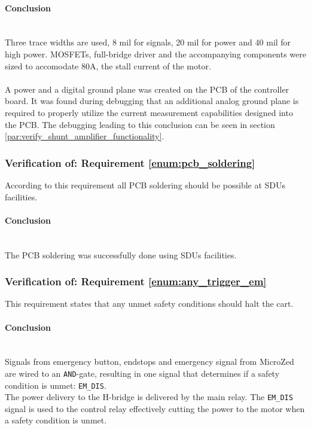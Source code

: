 \paragraph{Conclusion}~\\
Three trace widths are used, 8 mil for signals, 20 mil for power and 40 mil for high power.
MOSFETs, full-bridge driver and the accompanying components were sized to accomodate 80A, the stall current of the motor.
\\~\\
A power and a digital ground plane was created on the PCB of the controller board.
It was found during debugging that an additional analog ground plane is required to properly utilize the current measurement capabilities designed into the PCB.
The debugging leading to this conclusion can be seen in section \ref{par:verify_shunt_amplifier_functionality}.

\subsubsection{Verification of: Requirement \ref{enum:pcb_soldering}} %
\label{ssub:requirement_enum:pcb_soldering}
According to this requirement all PCB soldering should be possible at SDUs facilities.
\paragraph{Conclusion}~\\
The PCB soldering was successfully done using SDUs facilities.

\subsubsection{Verification of: Requirement \ref{enum:any_trigger_em}} %
\label{ssub:requirement_enum:any_trigger_em}
This requirement states that any unmet safety conditions should halt the cart.

\paragraph{Conclusion}~\\
Signals from emergency button, endstops and emergency signal from MicroZed are wired to an \texttt{AND}-gate, resulting in one signal that determines if a safety condition is unmet: \texttt{EM\_DIS}.
\\
The power delivery to the H-bridge is delivered by the main relay.
The \texttt{EM\_DIS} signal is used to the control relay effectively cutting the power to the motor when a safety condition is unmet.
